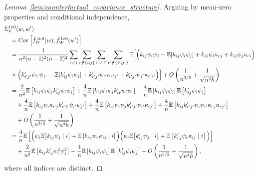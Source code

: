 \begin{proof}[Lemma~\ref{lem:counterfactual_covariance_structure}]

  Arguing by mean-zero properties and conditional independence,
  \begin{align*}
    &\Sigma_n^{1 \triangleright 0}(w,w') \\
    &\quad=
    \operatorname{Cov}\left[
      \hat f_W^{\,1 \triangleright 0}(w),
      \hat f_W^{\,1 \triangleright 0}(w')
    \right] \\
    &\quad=
    \frac{1}{n^2(n-1)^2(n-2)^2}
    \sum_{i \neq j}
    \sum_{r \notin \{i,j\}}
    \sum_{i' \neq j'}
    \sum_{r' \notin \{i',j'\}}
    \mathbb{E}\Big[
      \Big(
      k_{ij} \psi_i \psi_j
      - \mathbb{E}[k_{ij} \psi_i \psi_j]
      + k_{ij}\psi_i \kappa_{r j}
      + k_{ij}\psi_j \kappa_{r i}
      \Big) \\
      &\quad\times
      \Big(
      k_{i' j'}' \psi_{i'} \psi_{j'}
      - \mathbb{E}[k_{ij}' \psi_i \psi_j]
      + k_{i' j'}'\psi_{i'} \kappa_{r' j'}
      + k_{i' j'}'\psi_{j'} \kappa_{r' i'}
      \Big)
      \Big]
    + O\left( \frac{1}{n^{3/2}} + \frac{1}{\sqrt{n^4h}} \right) \\
    &\quad=
    \frac{2}{n^2}
    \mathbb{E}\left[
      k_{ij} \psi_i \psi_j
      k_{ij}' \psi_i \psi_j
    \right]
    + \frac{4}{n}
    \mathbb{E}\left[
      k_{ij} \psi_i \psi_j
      k_{ir}' \psi_i \psi_r
    \right]
    - \frac{4}{n}
    \mathbb{E}\left[
      k_{ij} \psi_i \psi_j
    \right]
    \mathbb{E}\left[
      k_{ij}' \psi_i \psi_j
    \right] \\
    &\qquad+
    \frac{4}{n}
    \mathbb{E}\left[
      k_{ij}\psi_i \kappa_{i' j}
      k_{i' j'}' \psi_{i'} \psi_{j'}
    \right]
    + \frac{4}{n}
    \mathbb{E}\left[
      k_{ij} \psi_{i} \psi_{j}
      k_{i' j'}'\psi_{i'} \kappa_{ij'}
    \right]
    + \frac{4}{n}
    \mathbb{E}\left[
      k_{ij} k'_{i' j'}
      \psi_i \psi_{i'}
      \kappa_{r j} \kappa_{r j'}
    \right] \\
    &\qquad+
    O\left( \frac{1}{n^{3/2}} + \frac{1}{\sqrt{n^4h}} \right) \\
    &\quad=
    \frac{4}{n}
    \mathbb{E}\left[
      \Big(
      \psi_i
      \mathbb{E}\big[
        k_{ij} \psi_j
        \mid i
        \big]
      + \mathbb{E}\left[
        k_{r j} \psi_r \kappa_{ij}
        \mid i
      \right]
      \Big)
      \Big(
      \psi_i
      \mathbb{E}\big[
        k_{ij}' \psi_j
        \mid i
        \big]
      + \mathbb{E}\left[
        k_{r j}' \psi_r \kappa_{ij}
        \mid i
      \right]
      \Big)
    \right] \\
    &\qquad+
    \frac{2}{n^2}
    \mathbb{E}\left[
      k_{ij} k_{ij}'
      \psi_i^2 \psi_j^2
    \right]
    - \frac{4}{n}
    \mathbb{E}\left[
      k_{ij} \psi_i \psi_j
    \right]
    \mathbb{E}\left[
      k_{ij}' \psi_i \psi_j
    \right]
    + O\left( \frac{1}{n^{3/2}} + \frac{1}{\sqrt{n^4h}} \right),
  \end{align*}
  where all indices are distinct.
\end{proof}

